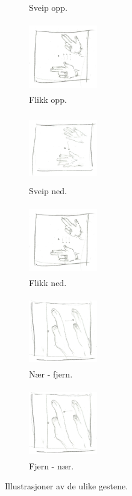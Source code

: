 \begin{figure}[h]
\begin{subfigure}{0.23\textwidth}
\caption{Sveip opp.}
\label{fig:sveip-opp}
\end{subfigure}
\begin{subfigure}{0.23\textwidth}
\includegraphics[width=3cm, height=3cm]{fig/flick-d-u}
\caption{Flikk opp.}
\label{fig:flikk-opp}
\end{subfigure}
\begin{subfigure}{0.23\textwidth}
\includegraphics[width=3cm, height=3cm]{fig/swipe-u-d}
\caption{Sveip ned.}
\label{fig:sveip-ned}
\end{subfigure}
\begin{subfigure}{0.23\textwidth}
\includegraphics[width=3cm, height=3cm]{fig/flick-u-d}
\caption{Flikk ned.}
\label{fig:flikk-ned}
\end{subfigure}
\begin{subfigure}{0.25\textwidth}
\includegraphics[width=3cm, height=3cm]{fig/near-far}
\caption{Nær - fjern.}
\label{fig:n-f}
\end{subfigure}
\begin{subfigure}{0.23\textwidth}
\includegraphics[width=3cm, height=3cm]{fig/far-near}
\caption{Fjern - nær.}
\label{fig:f-n}
\end{subfigure}
\caption{Illustrasjoner av de ulike gestene.}
\label{fig:gester}
\end{figure}

